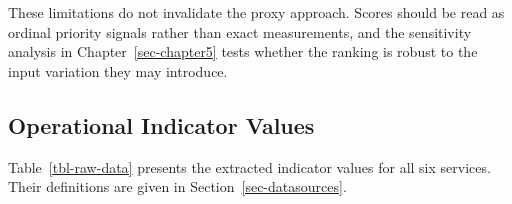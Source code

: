 \documentclass[
  12pt,
  letterpaper,
  12pt,
  oneside,
  english,
  onehalfspacing,
  headsepline]{MastersDoctoralThesis}
\begin{document}
These limitations do not invalidate the proxy approach. Scores should be
read as ordinal priority signals rather than exact measurements, and the
sensitivity analysis in Chapter~\ref{sec-chapter5} tests whether the
ranking is robust to the input variation they may introduce.

\subsection{Operational Indicator
Values}\label{operational-indicator-values}

Table~\ref{tbl-raw-data} presents the extracted indicator values for all
six services. Their definitions are given in
Section~\ref{sec-datasources}.

\begin{samepage}
\footnotesize


\end{samepage}
\end{document}
